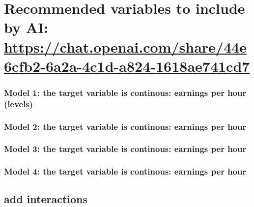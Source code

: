 \documentclass[
]{article}
\begin{document}
\hypertarget{recommended-variables-to-include-by-ai-httpschat.openai.comshare44e6cfb2-6a2a-4c1d-a824-1618ae741cd7}{%
\section{\texorpdfstring{Recommended variables to include by AI:
\url{https://chat.openai.com/share/44e6cfb2-6a2a-4c1d-a824-1618ae741cd7}}{Recommended variables to include by AI: https://chat.openai.com/share/44e6cfb2-6a2a-4c1d-a824-1618ae741cd7}}\label{recommended-variables-to-include-by-ai-httpschat.openai.comshare44e6cfb2-6a2a-4c1d-a824-1618ae741cd7}}

\hypertarget{model-1-the-target-variable-is-continous-earnings-per-hour-levels}{%
\subsubsection{Model 1: the target variable is continous: earnings per
hour
(levels)}\label{model-1-the-target-variable-is-continous-earnings-per-hour-levels}}

\hypertarget{model-2-the-target-variable-is-continous-earnings-per-hour}{%
\subsubsection{Model 2: the target variable is continous: earnings per
hour}\label{model-2-the-target-variable-is-continous-earnings-per-hour}}

\hypertarget{model-3-the-target-variable-is-continous-earnings-per-hour}{%
\subsubsection{Model 3: the target variable is continous: earnings per
hour}\label{model-3-the-target-variable-is-continous-earnings-per-hour}}

\hypertarget{model-4-the-target-variable-is-continous-earnings-per-hour}{%
\subsubsection{Model 4: the target variable is continous: earnings per
hour}\label{model-4-the-target-variable-is-continous-earnings-per-hour}}

\hypertarget{add-interactions}{%
\subsection{add interactions}\label{add-interactions}}
\end{document}
